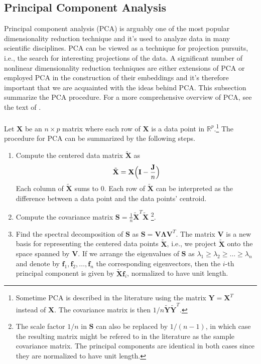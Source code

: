 \subsection{Principal Component Analysis}
\label{sec:princ-comp-analys}
Principal component analysis (PCA) is arguably one of the most popular
dimensionality reduction technique and it's used to analyze data in
many scientific disciplines. PCA can be viewed as a technique
for projection pursuits, i.e., the search for interesting projections
of the data. A significant number of nonlinear dimensionality
reduction techniques are either extensions of PCA or employed PCA in
the construction of their embeddings and it's therefore important that
we are acquainted with the ideas behind PCA. This subsection summarize
the PCA procedure. For a more comprehensive overview of PCA, see the
text of \citet{jolliffe02:_princ_compon_analy}. \\ \\
%
Let $\mathbf{X}$ be an $n \times p$ matrix where each row of
$\mathbf{X}$ is a data point in $\mathbb{R}^{p}$.\footnote{Sometime
  PCA is described in the literature using the matrix $\mathbf{Y} =
  \mathbf{X}^{T}$ instead of $\mathbf{X}$. The covariance matrix is
  then $1/n\tilde{\mathbf{Y}}\tilde{\mathbf{Y}}^{T}$.} The procedure
for PCA can be summarized by the following steps.
\begin{enumerate}
\item Compute the centered data matrix $\tilde{\mathbf{X}}$ as
  \begin{equation}
    \label{eq:97}
    \tilde{\mathbf{X}} = \mathbf{X}\Bigl(\mathbf{I} - \frac{\mathbf{J}}{n}\Bigr)
  \end{equation}
  Each column of $\tilde{\mathbf{X}}$ sums to $0$. Each row of
  $\tilde{\mathbf{X}}$ can be interpreted as the difference between
  a data point and the data points' centroid. 
\item Compute the covariance matrix $\mathbf{S} =
  \frac{1}{n}\tilde{\mathbf{X}}^{T}\tilde{\mathbf{X}}$ \footnote{The
    scale factor $1/n$ in $\mathbf{S}$ can also be replaced by
    $1/(n-1)$, in which case the resulting matrix might be refered to
    in the literature as the sample covariance matrix. The 
    principal components are identical in both cases since they are
    normalized to have unit length.}.
\item Find the spectral decomposition of $\mathbf{S}$ as $\mathbf{S} =
  \mathbf{V} \bm{\Lambda} \mathbf{V}^{T}$. The matrix $\mathbf{V}$ is
  a new basis for representing the centered data points $\tilde{\mathbf{X}}$,
  i.e., we project $\tilde{\mathbf{X}}$ onto the space spanned by
  $\mathbf{V}$.  If we arrange the eigenvalues of $\mathbf{S}$ as
  $\lambda_1 \geq \lambda_2 \geq \dots \geq \lambda_n$ and denote by
  $\mathbf{f}_1, \mathbf{f}_2, \dots, \mathbf{f}_n$ the corresponding
  eigenvectors, then the $i$-th principal component is given by
  $\tilde{\mathbf{X}}\mathbf{f}_i$, normalized to have unit length.
\end{enumerate}
